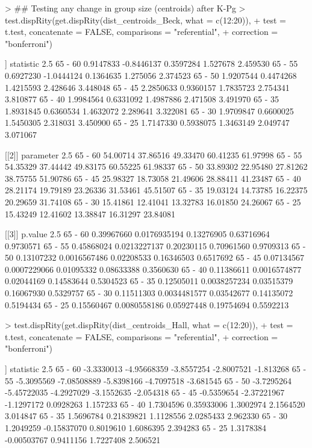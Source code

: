 \documentclass{article}
\begin{document}
\begin{Schunk}
\begin{Sinput}
> ## Testing any change in group size (centroids) after K-Pg
> test.dispRity(get.dispRity(dist_centroids_Beck, what = c(12:20)),
+     test = t.test, concatenate = FALSE, comparisons = "referential",
+     correction = "bonferroni")
\end{Sinput}
\begin{Soutput}
[[1]]
        statistic       2.5%       25%      75%    97.5%
65 - 60 0.9147833 -0.8446137 0.3597284 1.527678 2.459530
65 - 55 0.6927230 -1.0444124 0.1364635 1.275056 2.374523
65 - 50 1.9207544  0.4474268 1.4215593 2.428646 3.448048
65 - 45 2.2850633  0.9360157 1.7835723 2.754341 3.810877
65 - 40 1.9984564  0.6331092 1.4987886 2.471508 3.491970
65 - 35 1.8931845  0.6360534 1.4632072 2.289641 3.322081
65 - 30 1.9709847  0.6600025 1.5450305 2.318031 3.450900
65 - 25 1.7147330  0.5938075 1.3463149 2.049747 3.071067

[[2]]
        parameter     2.5%      25%      75%    97.5%
65 - 60  54.00714 37.86516 49.33470 60.41235 61.97998
65 - 55  54.35329 37.44442 49.83175 60.55225 61.98337
65 - 50  33.89302 22.95480 27.81262 38.75755 51.90786
65 - 45  25.98327 18.73058 21.49606 28.88411 41.23487
65 - 40  28.21174 19.79189 23.26336 31.53461 45.51507
65 - 35  19.03124 14.73785 16.22375 20.29659 31.74108
65 - 30  15.41861 12.41041 13.32783 16.01850 24.26067
65 - 25  15.43249 12.41602 13.38847 16.31297 23.84081

[[3]]
           p.value         2.5%        25%        75%     97.5%
65 - 60 0.39967660 0.0176935194 0.13276905 0.63716964 0.9730571
65 - 55 0.45868024 0.0213227137 0.20230115 0.70961560 0.9709313
65 - 50 0.13107232 0.0016567486 0.02208533 0.16346503 0.6517692
65 - 45 0.07134567 0.0007229066 0.01095332 0.08633388 0.3560630
65 - 40 0.11386611 0.0016574877 0.02044169 0.14583644 0.5304523
65 - 35 0.12505011 0.0038257234 0.03515379 0.16067930 0.5329757
65 - 30 0.11511303 0.0034481577 0.03542677 0.14135072 0.5194434
65 - 25 0.15560467 0.0080558186 0.05927448 0.19754694 0.5592213
\end{Soutput}
\begin{Sinput}
> test.dispRity(get.dispRity(dist_centroids_Hall, what = c(12:20)),
+     test = t.test, concatenate = FALSE, comparisons = "referential",
+     correction = "bonferroni")
\end{Sinput}
\begin{Soutput}
[[1]]
         statistic        2.5%        25%        75%     97.5%
65 - 60 -3.3330013 -4.95668359 -3.8557254 -2.8007521 -1.813268
65 - 55 -5.3095569 -7.08508889 -5.8398166 -4.7097518 -3.681545
65 - 50 -3.7295264 -5.45722035 -4.2927029 -3.1552635 -2.054318
65 - 45 -0.5359654 -2.37221967 -1.1297172  0.0928263  1.157233
65 - 40  1.7304596  0.35933006  1.3002974  2.1564520  3.014847
65 - 35  1.5696784  0.21839821  1.1128556  2.0285433  2.962330
65 - 30  1.2049259 -0.15837070  0.8019610  1.6086395  2.394283
65 - 25  1.3178384 -0.00503767  0.9411156  1.7227408  2.506521


\end{Soutput}
\end{Schunk}
\end{document}
